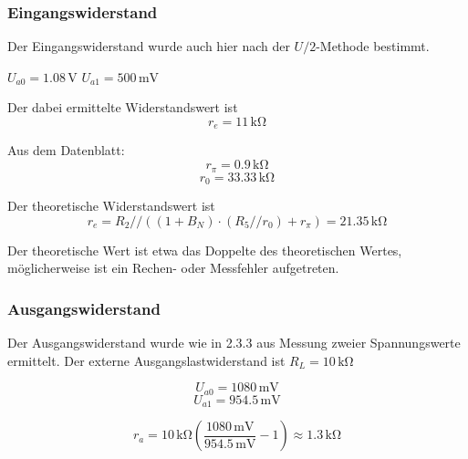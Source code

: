 \subsubsection{Eingangswiderstand}
Der Eingangswiderstand wurde auch hier nach der $U/2$-Methode bestimmt.

$U_{a0} = 1.08 \, \si{\volt}$
$U_{a1} = 500 \, \si{\milli\volt}$

Der dabei ermittelte Widerstandswert ist
\[r_e = 11 \, \si{\kilo\ohm}\]

Aus dem Datenblatt:
\[r_\pi = 0.9 \, \si{\kilo\ohm}\]
\[r_0 = 33.33 \, \si{\kilo\ohm}\]

Der theoretische Widerstandswert ist
\[r_{e} = R_2 // ((1+B_N) \cdot (R_5 // r_0) + r_\pi) = 21.35 \, \si{\kilo\ohm}\]

Der theoretische Wert ist etwa das Doppelte des theoretischen Wertes,
möglicherweise ist ein Rechen- oder Messfehler aufgetreten.

\subsubsection{Ausgangswiderstand}
Der Ausgangswiderstand wurde wie in 2.3.3 aus Messung zweier Spannungswerte
ermittelt. Der externe Ausgangslastwiderstand ist $R_L = 10 \, \si{\kilo\ohm}$

\[U_{a0} = 1080 \,\si{\milli\volt}\]
\[U_{a1} =  954.5 \,\si{\milli\volt}\]

\[r_a = 10 \, \si{\kilo\ohm} \left( \frac{1080 \, \si{\milli\volt}}{954.5 \,
      \si{\milli\volt}} -1 \right) \approx 1.3 \, \si{\kilo\ohm}\]



